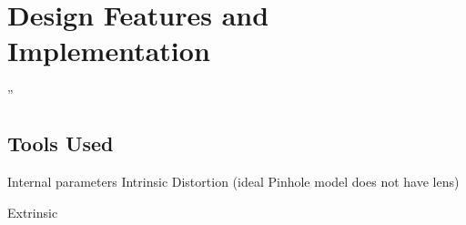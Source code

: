 \chapter{Design Features and Implementation} %
\label{chap:Chapter4}  %

\epigraph{” }{\textit{}}



\section{Tools Used} \label{sec:design-tools}

Internal parameters
    Intrinsic 
    Distortion (ideal Pinhole model does not have lens)

    
Extrinsic 
